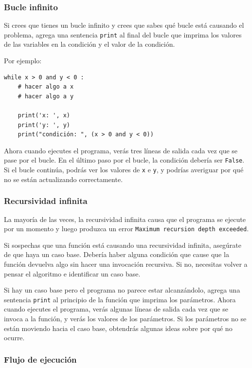 \documentclass[10pt]{book}
\begin{document}
\subsubsection{Bucle infinito}

Si crees que tienes un bucle infinito y crees que sabes
qué bucle está causando el problema, agrega una sentencia {\tt print}
al final del bucle que imprima los valores de las variables en
la condición y el valor de la condición.

Por ejemplo:

\begin{verbatim}
while x > 0 and y < 0 :
    # hacer algo a x
    # hacer algo a y 

    print('x: ', x)
    print('y: ', y)
    print("condición: ", (x > 0 and y < 0))
\end{verbatim}
%
Ahora cuando ejecutes el programa, verás tres líneas de salida
cada vez que se pase por el bucle.  En el último paso por el
bucle, la condición debería ser {\tt False}.  Si el bucle
continúa, podrás ver los valores de {\tt x} e {\tt y},
y podrías averiguar por qué no se están actualizando correctamente.


\subsubsection{Recursividad infinita}

La mayoría de las veces, la recursividad infinita causa que el programa se
ejecute por un momento y luego produzca un error
{\tt Maximum recursion depth exceeded}.

Si sospechas que una función está causando una recursividad
infinita, asegúrate de que haya un caso base.
Debería haber alguna condición que cause que la
función devuelva algo sin hacer una invocación recursiva.
Si no, necesitas volver a pensar el algoritmo e identificar un caso
base.

Si hay un caso base pero el programa no parece estar alcanzándolo,
agrega una sentencia {\tt print} al principio de la función
que imprima los parámetros.  Ahora cuando ejecutes el programa, verás
algunas líneas de salida cada vez que se invoca a la función,
y verás los valores de los parámetros.  Si los parámetros no se están moviendo
hacia el caso base, obtendrás algunas ideas sobre por qué no ocurre.


\subsubsection{Flujo de ejecución}
\end{document}
